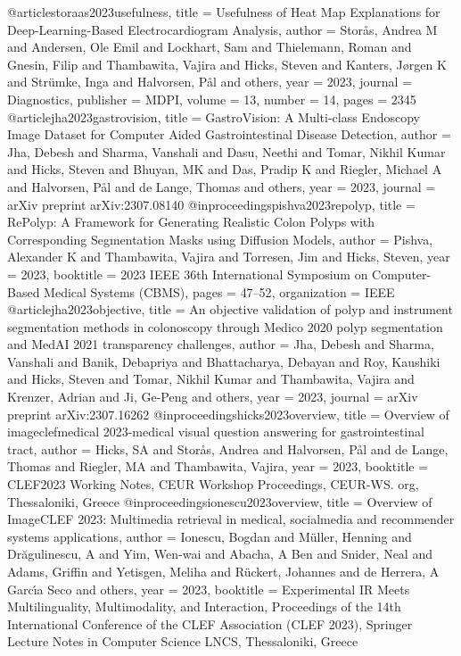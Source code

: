 @article{storaas2023usefulness,
	title = {Usefulness of Heat Map Explanations for Deep-Learning-Based Electrocardiogram Analysis},
	author = {Stor{\aa}s, Andrea M and Andersen, Ole Emil and Lockhart, Sam and Thielemann, Roman and Gnesin, Filip and Thambawita, Vajira and Hicks, Steven and Kanters, J{\o}rgen K and Str{\"u}mke, Inga and Halvorsen, P{\aa}l and others},
	year = 2023,
	journal = {Diagnostics},
	publisher = {MDPI},
	volume = 13,
	number = 14,
	pages = 2345
}
@article{jha2023gastrovision,
	title = {GastroVision: A Multi-class Endoscopy Image Dataset for Computer Aided Gastrointestinal Disease Detection},
	author = {Jha, Debesh and Sharma, Vanshali and Dasu, Neethi and Tomar, Nikhil Kumar and Hicks, Steven and Bhuyan, MK and Das, Pradip K and Riegler, Michael A and Halvorsen, P{\aa}l and de Lange, Thomas and others},
	year = 2023,
	journal = {arXiv preprint arXiv:2307.08140}
}
@inproceedings{pishva2023repolyp,
	title = {RePolyp: A Framework for Generating Realistic Colon Polyps with Corresponding Segmentation Masks using Diffusion Models},
	author = {Pishva, Alexander K and Thambawita, Vajira and Torresen, Jim and Hicks, Steven},
	year = 2023,
	booktitle = {2023 IEEE 36th International Symposium on Computer-Based Medical Systems (CBMS)},
	pages = {47--52},
	organization = {IEEE}
}
@article{jha2023objective,
	title = {An objective validation of polyp and instrument segmentation methods in colonoscopy through Medico 2020 polyp segmentation and MedAI 2021 transparency challenges},
	author = {Jha, Debesh and Sharma, Vanshali and Banik, Debapriya and Bhattacharya, Debayan and Roy, Kaushiki and Hicks, Steven and Tomar, Nikhil Kumar and Thambawita, Vajira and Krenzer, Adrian and Ji, Ge-Peng and others},
	year = 2023,
	journal = {arXiv preprint arXiv:2307.16262}
}
@inproceedings{hicks2023overview,
	title = {Overview of imageclefmedical 2023-medical visual question answering for gastrointestinal tract},
	author = {Hicks, SA and Stor{\aa}s, Andrea and Halvorsen, P{\aa}l and de Lange, Thomas and Riegler, MA and Thambawita, Vajira},
	year = 2023,
	booktitle = {CLEF2023 Working Notes, CEUR Workshop Proceedings, CEUR-WS. org, Thessaloniki, Greece}
}
@inproceedings{ionescu2023overview,
	title = {Overview of ImageCLEF 2023: Multimedia retrieval in medical, socialmedia and recommender systems applications},
	author = {Ionescu, Bogdan and M{\"u}ller, Henning and Dr{\u{a}}gulinescu, A and Yim, Wen-wai and Abacha, A Ben and Snider, Neal and Adams, Griffin and Yetisgen, Meliha and R{\"u}ckert, Johannes and de Herrera, A Garc{\'\i}a Seco and others},
	year = 2023,
	booktitle = {Experimental IR Meets Multilinguality, Multimodality, and Interaction, Proceedings of the 14th International Conference of the CLEF Association (CLEF 2023), Springer Lecture Notes in Computer Science LNCS, Thessaloniki, Greece}
}
